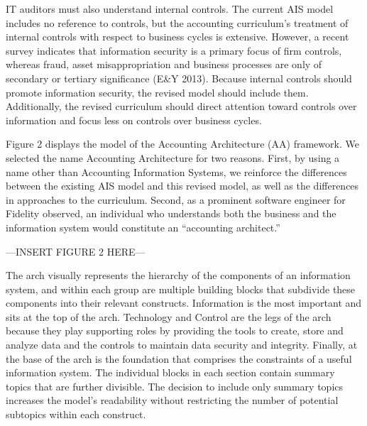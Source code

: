\documentclass[12pt]{article}
\newcommand{\InsertGraphic}[1]{\vspace{.1in}\noindent{}\centerline{\MakeUppercase{---\quad{}Insert #1 here\quad{}---}}\vspace{.1in}}
\begin{document}
IT auditors must also understand internal controls. The current AIS model includes no reference to controls, but the accounting curriculum's treatment of internal controls with respect to business cycles is extensive. However, a recent survey indicates that information security is a primary focus of firm controls, whereas fraud, asset misappropriation and business processes are only of secondary or tertiary significance (E\&Y 2013). Because internal controls should promote information security, the revised model should include them. Additionally, the revised curriculum should direct attention toward controls over information and focus less on controls over business cycles.

Figure 2 displays the model of the Accounting Architecture (AA) framework. We selected the name Accounting Architecture for two reasons. First, by using a name other than Accounting Information Systems, we reinforce the differences between the existing AIS model and this revised model, as well as the differences in approaches to the curriculum. Second, as a prominent software engineer for Fidelity observed, an individual who understands both the business and the information system would constitute an ``accounting architect.''

\InsertGraphic{Figure 2}

The arch visually represents the hierarchy of the components of an information system, and within each group are multiple building blocks that subdivide these components into their relevant constructs. Information is the most important and sits at the top of the arch. Technology and Control are the legs of the arch because they play supporting roles by providing the tools to create, store and analyze data and the controls to maintain data security and integrity. Finally, at the base of the arch is the foundation that comprises the constraints of a useful information system. The individual blocks in each section contain summary topics that are further divisible. The decision to include only summary topics increases the model's readability without restricting the number of potential subtopics within each construct.
\end{document}
